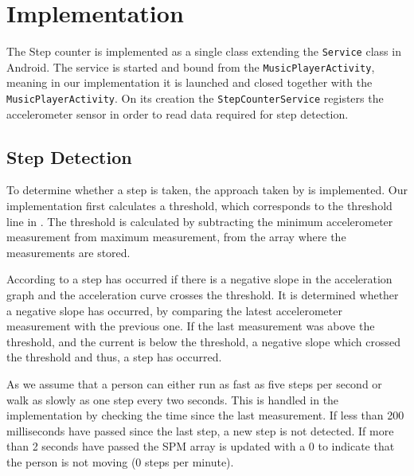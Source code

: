 \section{Implementation}
The Step counter is implemented as a single class extending the \texttt{Service} class in Android. The service is started and bound from the \texttt{MusicPlayerActivity}, meaning in our implementation it is launched and closed together with the \texttt{MusicPlayerActivity}. On its creation the \texttt{StepCounterService} registers the accelerometer sensor in order to read data required for step detection.


\subsection{Step Detection}\label{sec:stepCnt}
To determine whether a step is taken, the approach taken by \citet{zhao:pedometer} is implemented. Our implementation first calculates a threshold, which corresponds to the threshold line in . The threshold is calculated by subtracting the minimum accelerometer measurement from maximum measurement, from the array where the measurements are stored.

According to \citet[p. 2]{zhao:pedometer} a step has occurred if there is a negative slope in the acceleration graph and the acceleration curve crosses the threshold. It is determined whether a negative slope has occurred, by comparing the latest accelerometer measurement with the previous one. If the last measurement was above the threshold, and the current is below the threshold, a negative slope which crossed the threshold and thus, a step has occurred.

As \citet[p. 2]{zhao:pedometer} we assume that a person can either run as fast as five steps per second or walk as slowly as one step every two seconds. This is handled in the implementation by checking the time since the last measurement. If less than 200 milliseconds have passed since the last step, a new step is not detected. If more than 2 seconds have passed the SPM array is updated with a 0 to indicate that the person is not moving (0 steps per minute).

